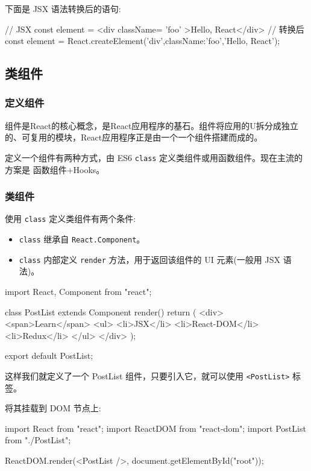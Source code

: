 下面是 JSX 语法转换后的语句:

\begin{JavaScript}
// JSX
const element = <div className= 'foo' >Hello, React</div> 
// 转换后
const element = React.createElement('div',{className:'foo'},'Hello, React'); 
\end{JavaScript}

\subsection{类组件}

\subsubsection{定义组件}

组件是React的核心概念，是React应用程序的基石。组件将应用的U拆分成独立的、可复用的模块，React应用程序正是由一个一个组件搭建而成的。

定义一个组件有两种方式，由 ES6 \texttt{class} 定义类组件或用函数组件。现在主流的方案是 函数组件+Hooks。

\subsubsection*{类组件}

使用 \texttt{class} 定义类组件有两个条件:
\begin{itemize}
    \item \texttt{class} 继承自 \texttt{React.Component}。
    \item \texttt{class} 内部定义 \texttt{render} 方法，用于返回该组件的 UI 元素(一般用 JSX 语法)。
\end{itemize}

\begin{JavaScript}
import React, { Component } from "react";

class PostList extends Component {
  render() {
    return (
      <div>
        <span>Learn</span>
        <ul>
          <li>JSX</li>
          <li>React-DOM</li>
          <li>Redux</li>
        </ul>
      </div>
    );
  }
}

export default PostList;
\end{JavaScript}

这样我们就定义了一个 PostList 组件，只要引入它，就可以使用 \texttt{<PostList>} 标签。 

将其挂载到 DOM 节点上:

\begin{JavaScript}
import React from "react";
import ReactDOM from "react-dom";
import PostList from "./PostList";

ReactDOM.render(<PostList />, document.getElementById("root"));
\end{JavaScript}

